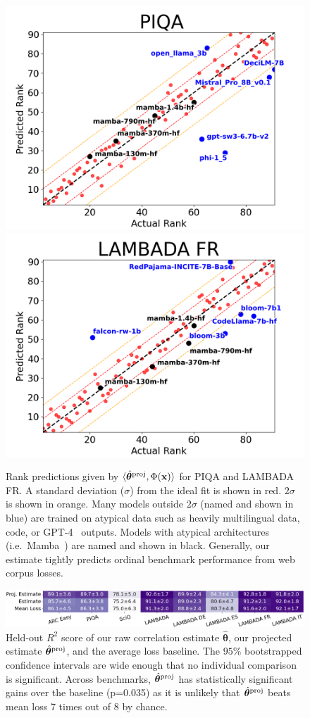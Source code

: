 \documentclass{article} %
\newcommand{\bmthproj}{\hat{\bm{\theta}}^{\textnormal{proj}}}
\begin{document}
\begin{figure}[t]
\centering

\includegraphics[width=0.495\linewidth]{images/piqa-5-fold-leave-out-rank.png}
\includegraphics[width=0.495\linewidth]{images/lambada-fr-5-fold-leave-out-rank.png}

\caption{Rank predictions given by $\langle\bmthproj,\Phi(\mathbf{x})\rangle$ for PIQA and LAMBADA FR. A standard deviation ($\sigma$) from the ideal fit is shown in red. $2\sigma$ is shown in orange. Many models outside $2\sigma$ (named and shown in blue) are trained on atypical data such as heavily multilingual data, code, or GPT-4~\citep{gpt} outputs. Models with atypical architectures (i.e.\ Mamba~\citep{mamba}) are named and shown in black. Generally, our estimate tightly predicts ordinal benchmark performance from web corpus losses.}
\label{pred_figure}
\end{figure}

\begin{figure}[t]
\centering
\includegraphics[width=\linewidth]{images/rank-r2-heatmap.png}
\caption{Held-out $R^2$ score of our raw correlation estimate $\hat{\bm{\theta}}$, our projected estimate $\bmthproj$, and the average loss baseline. The $95\%$ bootstrapped confidence intervals are wide enough that no individual comparison is significant. Across benchmarks, $\bmthproj$ has statistically significant gains over the baseline (p=0.035) as it is unlikely that  $\bmthproj$ beats mean loss 7 times out of 8 by chance.}
\label{fig:weight_figure:r2}
\end{figure}
\end{document}
